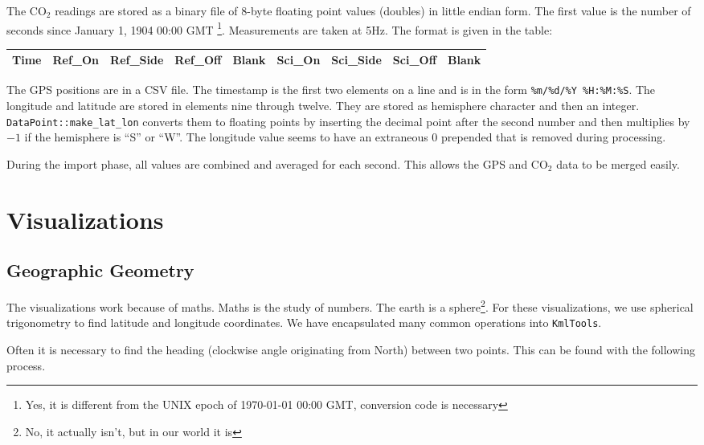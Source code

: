 \documentclass[12pt]{article}
\begin{document}
The CO$_2$ readings are stored as a binary file of 8-byte floating point values (doubles) in little endian form.  The first value is the number of seconds since January 1, 1904 00:00 GMT \footnote{Yes, it is different from the UNIX epoch of 1970-01-01 00:00 GMT, conversion code is necessary}. Measurements are taken at 5Hz. The format is given in the table:

\begin{center}
\begin{tabular}{|l|l|l|l|l|l|l|l|l|}
\hline 
Time & Ref\_On & Ref\_Side & Ref\_Off & Blank & Sci\_On & Sci\_Side & Sci\_Off & Blank \\
\hline
\end{tabular}
\end{center}

The GPS positions are in a CSV file.  The timestamp is the first two elements on a line and is in the form \texttt{\%m/\%d/\%Y \%H:\%M:\%S}.  The longitude and latitude are stored in elements nine through twelve.  They are stored as hemisphere character and then an integer.  \texttt{DataPoint::make\_lat\_lon} converts them to floating points by inserting the decimal point after the second number and then multiplies by $-1$ if the hemisphere is ``S'' or ``W''. The longitude value seems to have an extraneous 0 prepended that is removed during processing.

During the import phase, all values are combined and averaged for each second.  This allows the GPS and CO$_2$ data to be merged easily.

\section*{Visualizations}

\subsection*{Geographic Geometry}

The visualizations work because of maths.  Maths is the study of numbers.  The earth is a sphere\footnote{No, it actually isn't, but in our world it is}.  For these visualizations, we use spherical trigonometry to find latitude and longitude coordinates.  We have encapsulated many common operations into \texttt{KmlTools}.

Often it is necessary to find the heading (clockwise angle originating from North) between two points.  This can be found with the following process.
\end{document}
